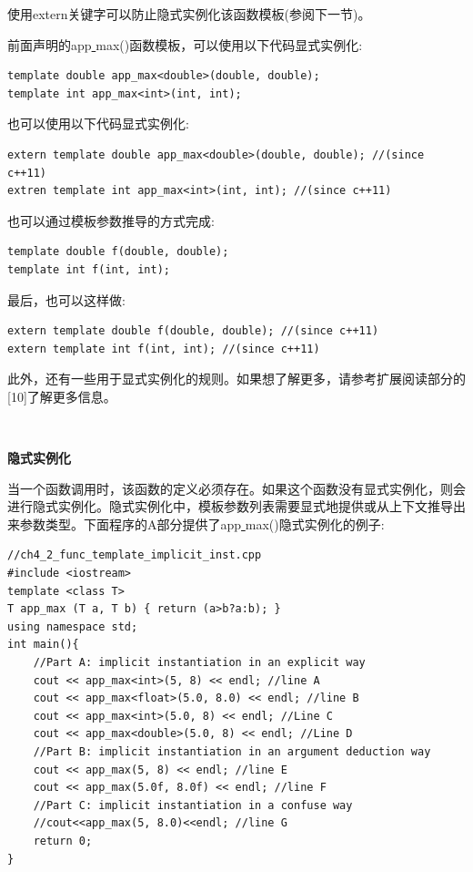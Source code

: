 使用extern关键字可以防止隐式实例化该函数模板(参阅下一节)。 \par
前面声明的app\underline{ }max()函数模板，可以使用以下代码显式实例化: \par

\begin{lstlisting}[caption={}]
template double app_max<double>(double, double);
template int app_max<int>(int, int);
\end{lstlisting}

也可以使用以下代码显式实例化: \par

\begin{lstlisting}[caption={}]
extern template double app_max<double>(double, double); //(since c++11)
extren template int app_max<int>(int, int); //(since c++11)
\end{lstlisting}

也可以通过模板参数推导的方式完成: \par

\begin{lstlisting}[caption={}]
template double f(double, double);
template int f(int, int);
\end{lstlisting}

最后，也可以这样做: \par

\begin{lstlisting}[caption={}]
extern template double f(double, double); //(since c++11)
extern template int f(int, int); //(since c++11)
\end{lstlisting}

此外，还有一些用于显式实例化的规则。如果想了解更多，请参考扩展阅读部分的[10]了解更多信息。 \par

\noindent\textbf{}\ \par
\textbf{隐式实例化} \ \par
当一个函数调用时，该函数的定义必须存在。如果这个函数没有显式实例化，则会进行隐式实例化。隐式实例化中，模板参数列表需要显式地提供或从上下文推导出来参数类型。下面程序的A部分提供了app\underline{ }max()隐式实例化的例子: \par

\begin{lstlisting}[caption={}]
//ch4_2_func_template_implicit_inst.cpp
#include <iostream>
template <class T>
T app_max (T a, T b) { return (a>b?a:b); }
using namespace std;
int main(){
	//Part A: implicit instantiation in an explicit way
	cout << app_max<int>(5, 8) << endl; //line A
	cout << app_max<float>(5.0, 8.0) << endl; //line B
	cout << app_max<int>(5.0, 8) << endl; //Line C
	cout << app_max<double>(5.0, 8) << endl; //Line D
	//Part B: implicit instantiation in an argument deduction way
	cout << app_max(5, 8) << endl; //line E
	cout << app_max(5.0f, 8.0f) << endl; //line F
	//Part C: implicit instantiation in a confuse way
	//cout<<app_max(5, 8.0)<<endl; //line G
	return 0;
}
\end{lstlisting}

